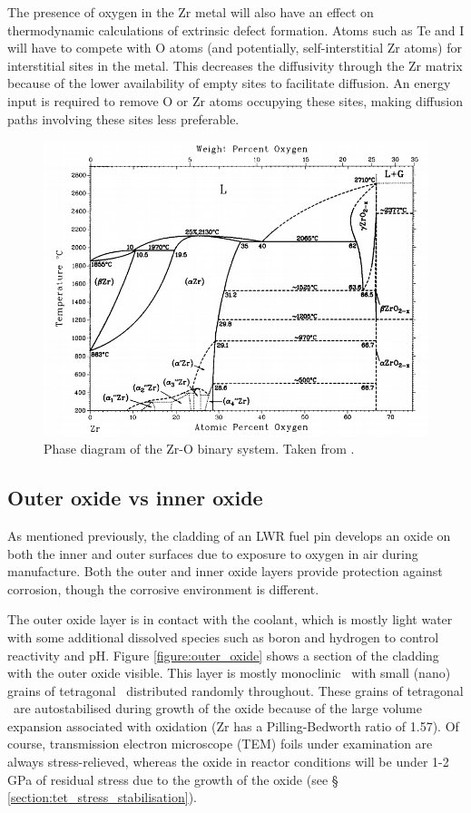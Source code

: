 The presence of oxygen in the Zr metal will also have an effect on thermodynamic calculations of extrinsic defect formation. Atoms such as Te and I will have to compete with O atoms (and potentially, self-interstitial Zr atoms) for interstitial sites in the metal. This decreases the diffusivity through the Zr matrix because of the lower availability of empty sites to facilitate diffusion. An energy input is required to remove O or Zr atoms occupying these sites, making diffusion paths involving these sites less preferable.


\begin{figure}[ht]
\centering
\includegraphics[width=14cm]{images/zro2_binary_phase.png}
\caption[Phase diagram of the Zr-O binary system.]{Phase diagram of the Zr-O binary system. Taken from \cite{Abriata1986}.}
\label{figure:binary_phase_diagram}
\end{figure}

\subsection{Outer oxide vs inner oxide} \label{section:outervsinner}

As mentioned previously, the cladding of an LWR fuel pin develops an oxide on both the inner and outer surfaces due to exposure to oxygen in air during manufacture. Both the outer and inner oxide layers provide protection against corrosion, though the corrosive environment is different. 

The outer oxide layer is in contact with the coolant, which is mostly light water with some additional dissolved species such as boron and hydrogen to control reactivity and pH. Figure \ref{figure:outer_oxide} shows a section of the cladding with the outer oxide visible. This layer is mostly monoclinic \zirconia\ with small (nano) grains of tetragonal \zirconia\ distributed randomly throughout. These grains of tetragonal \zirconia\ are autostabilised during growth of the oxide because of the large volume expansion associated with oxidation (Zr has a Pilling-Bedworth ratio of 1.57). Of course, transmission electron microscope (TEM) foils under examination are always stress-relieved, whereas the oxide in reactor conditions will be under 1-2 GPa of residual stress due to the growth of the oxide (see § \ref{section:tet_stress_stabilisation}).

